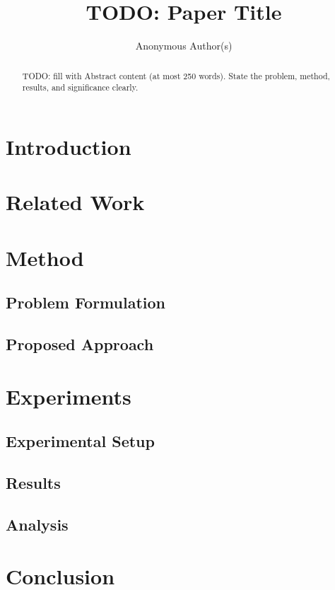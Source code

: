 \documentclass[letterpaper]{article}
\title{TODO: Paper Title}
\author{Anonymous Author(s)}
\begin{document}
\maketitle

\begin{abstract}
TODO: fill with Abstract content (at most 250 words). State the problem, method, results, and significance clearly.
\end{abstract}

\section{Introduction}

\section{Related Work}

\section{Method}

\subsection{Problem Formulation}

\subsection{Proposed Approach}

\section{Experiments}

\subsection{Experimental Setup}

\subsection{Results}

\subsection{Analysis}

\section{Conclusion}



\end{document}
